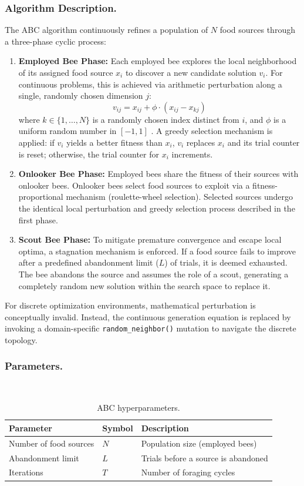 \subsubsection{Algorithm Description.}
The ABC algorithm continuously refines a population of $N$ food sources through a three-phase cyclic process:
\begin{enumerate}
    \item \textbf{Employed Bee Phase:} Each employed bee explores the local neighborhood of its assigned food source $x_i$ to discover a new candidate solution $v_i$. For continuous problems, this is achieved via arithmetic perturbation along a single, randomly chosen dimension $j$:
    \begin{equation}
        v_{ij} = x_{ij} + \phi \cdot (x_{ij} - x_{kj})
    \end{equation}
    where $k \in \{1, \dots, N\}$ is a randomly chosen index distinct from $i$, and $\phi$ is a uniform random number in $[-1, 1]$ \autocite{Karaboga2007}. A greedy selection mechanism is applied: if $v_i$ yields a better fitness than $x_i$, $v_i$ replaces $x_i$ and its trial counter is reset; otherwise, the trial counter for $x_i$ increments.
    \item \textbf{Onlooker Bee Phase:} Employed bees share the fitness of their sources with onlooker bees. Onlooker bees select food sources to exploit via a fitness-proportional mechanism (roulette-wheel selection). Selected sources undergo the identical local perturbation and greedy selection process described in the first phase.
    \item \textbf{Scout Bee Phase:} To mitigate premature convergence and escape local optima, a stagnation mechanism is enforced. If a food source fails to improve after a predefined abandonment limit ($L$) of trials, it is deemed exhausted. The bee abandons the source and assumes the role of a scout, generating a completely random new solution within the search space to replace it.
\end{enumerate}
For discrete optimization environments, mathematical perturbation is conceptually invalid. Instead, the continuous generation equation is replaced by invoking a domain-specific \texttt{random\_neighbor()} mutation to navigate the discrete topology.

\subsubsection{Parameters.}~

\begin{table}[H]
\centering
\caption{ABC hyperparameters.}
\label{tab:abc-params}
\begin{tabular}{l l p{7cm}}
\hline
\textbf{Parameter} & \textbf{Symbol} & \textbf{Description} \\
\hline
Number of food sources & $N$       & Population size (employed bees) \\
Abandonment limit      & $L$       & Trials before a source is abandoned \\
Iterations             & $T$       & Number of foraging cycles \\
\hline
\end{tabular}
\end{table}

